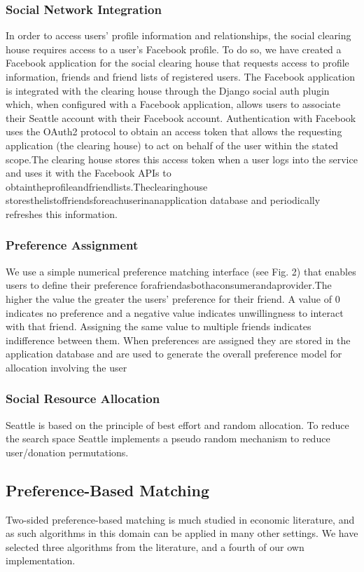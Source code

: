 \documentclass[a4paper,12pt]{article}
\begin{document}
	\subsubsection{Social Network Integration}
	In order to access users’ profile information and relationships, the social clearing house requires access to a user’s
Facebook profile. To do so, we have created a Facebook
application for the social clearing house that requests
access to profile information, friends and friend lists of
registered users. The Facebook application is integrated
with the clearing house through the Django social auth
plugin which, when configured with a Facebook application, allows users to associate their Seattle account with
their Facebook account. Authentication with Facebook
uses the OAuth2 protocol to obtain an access token that
allows the requesting application (the clearing house) to
act on behalf of the user within the stated scope.The
clearing house stores this access token when a user logs
into the service and uses it with the Facebook APIs to
obtaintheprofileandfriendlists.Theclearinghouse
storesthelistoffriendsforeachuserinanapplication
database and periodically refreshes this information.
	\subsubsection{Preference Assignment}
We use a simple numerical preference matching interface
(see Fig. 2) that enables users to define their preference
forafriendasbothaconsumerandaprovider.The
higher the value the greater the users’ preference for
their friend. A value of 0 indicates no preference and a
negative value indicates unwillingness to interact with
that friend. Assigning the same value to multiple friends
indicates indifference between them. When preferences
are assigned they are stored in the application database
and are used to generate the overall preference model
for allocation involving the user
	\subsubsection{Social Resource Allocation}
Seattle is based on the principle of best effort and random
allocation. To reduce the search space Seattle implements a pseudo random mechanism to reduce user/donation permutations.
	\subsection{Preference-Based Matching}
Two-sided preference-based matching is much studied in
economic literature, and as such algorithms in this domain
can be applied in many other settings. We have selected
three algorithms from the literature, and a fourth of our
own implementation.
\end{document}
